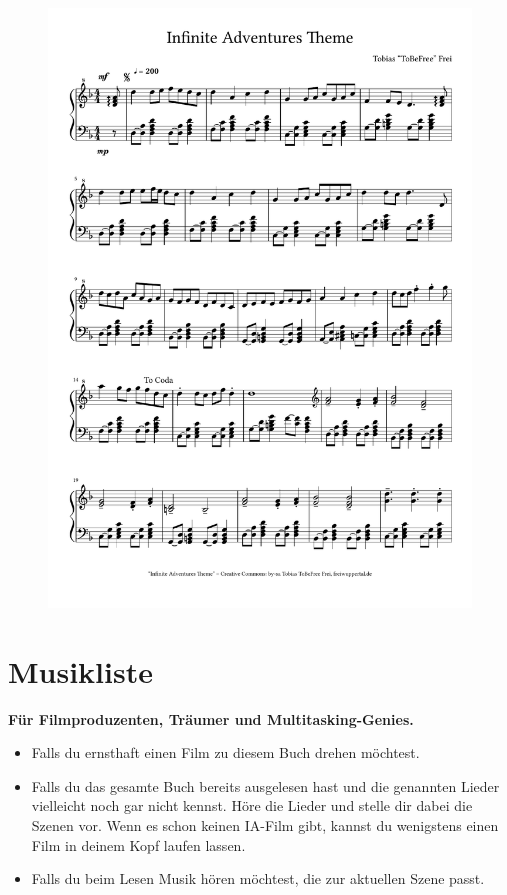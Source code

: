 \begin{figure}[p]
	\includegraphics[width=\textwidth, page=2]{include-main-iatheme.pdf}
\end{figure}


\chapter{Musikliste}

\textbf{Für Filmproduzenten, Träumer und Multitasking-Genies.}

\begin{itemize}
	\item Falls du ernsthaft einen Film zu diesem Buch drehen möchtest.
	\item Falls du das gesamte Buch bereits ausgelesen hast und die genannten Lieder vielleicht noch gar nicht kennst. Höre die Lieder und stelle dir dabei die Szenen vor. Wenn es schon keinen IA-Film gibt, kannst du wenigstens einen Film in deinem Kopf laufen lassen.
	\item Falls du beim Lesen Musik hören möchtest, die zur aktuellen Szene passt.
\end{itemize}

